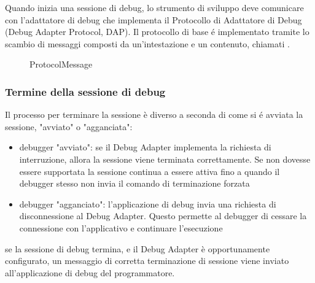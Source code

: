 Quando inizia una sessione di debug, lo strumento di sviluppo deve comunicare con l'adattatore di debug che implementa il Protocollo di Adattatore di Debug (Debug Adapter Protocol, DAP). Il protocollo di base é implementato tramite lo scambio di messaggi composti da un'intestazione e un contenuto, chiamati . 
\begin{figure}[H]
    
    \caption{ProtocolMessage\cite{DAPmessage}}
\end{figure}

\subsubsection*{Termine della sessione di debug}

Il processo per terminare la sessione è diverso a seconda di come si é avviata la sessione, "avviato" o "agganciata":

\begin{itemize}
    \item {
        debugger "avviato": se il Debug Adapter implementa la richiesta di interruzione, allora la sessione viene terminata correttamente. Se non dovesse essere supportata la sessione continua a essere attiva fino a quando il debugger stesso non invia il comando di terminazione forzata
    }
    \item {
        debugger "agganciato": l'applicazione di debug  invia una richiesta di disconnessione al Debug Adapter. Questo permette al debugger di cessare la connessione con l'applicativo e continuare l'esecuzione
    }
\end{itemize}

se la sessione di debug termina, e il Debug Adapter è opportunamente configurato, un messaggio di corretta terminazione di sessione viene inviato all'applicazione di debug del programmatore.

